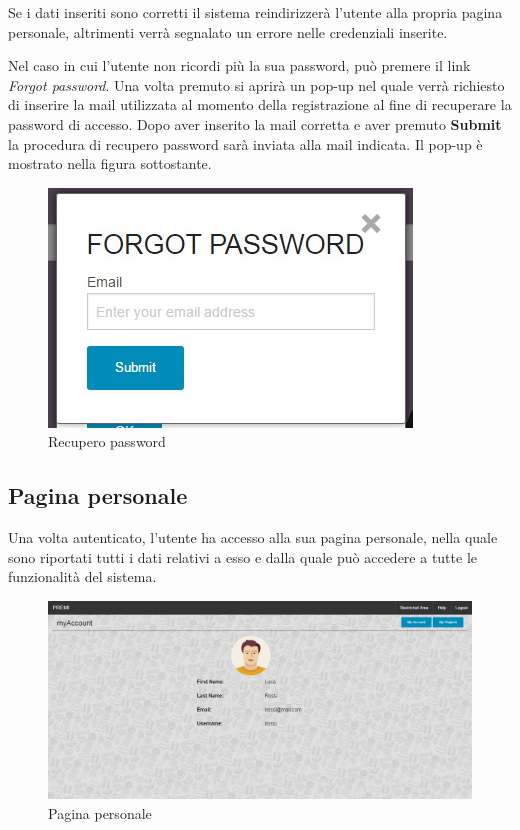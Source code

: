 \noindent Se i dati inseriti sono corretti il sistema reindirizzerà l'utente alla propria pagina personale, altrimenti verrà segnalato un errore nelle credenziali inserite.



\noindent Nel caso in cui l'utente non ricordi più la sua password, può premere il link \textit{Forgot password}. Una volta premuto si aprirà un pop-up nel quale verrà richiesto di inserire la mail utilizzata al momento della registrazione al fine di recuperare la password di accesso. Dopo aver inserito la mail corretta e aver premuto \textbf{Submit} la procedura di recupero password sarà inviata alla mail indicata. Il pop-up è mostrato nella figura sottostante.

\begin{figure}[H] 
	\centering 
	\includegraphics[scale=0.40] {img/forgot}
	\caption{Recupero password} 
\end{figure}

\subsection{Pagina personale}
Una volta autenticato, l'utente ha accesso alla sua pagina personale, nella quale sono riportati tutti i dati relativi a esso e dalla quale può accedere a tutte le funzionalità del sistema.

\begin{figure}[H] 
	\centering 
	\includegraphics[scale=0.40] {img/MyAccount}
	\caption{Pagina personale} 
\end{figure}

